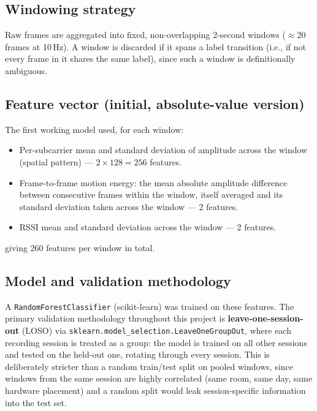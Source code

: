 \documentclass[11pt,a4paper]{article}
\begin{document}
\subsection{Windowing strategy}

Raw frames are aggregated into fixed, non-overlapping 2-second windows
(\(\approx\)20 frames at 10\,Hz). A window is discarded if it spans a
label transition (i.e., if not every frame in it shares the same
label), since such a window is definitionally ambiguous.

\subsection{Feature vector (initial, absolute-value version)}

The first working model used, for each window:
\begin{itemize}
    \item Per-subcarrier mean and standard deviation of amplitude across
    the window (spatial pattern) --- \(2 \times 128 = 256\) features.
    \item Frame-to-frame motion energy: the mean absolute
    amplitude difference between consecutive frames within the window,
    itself averaged and its standard deviation taken across the window
    --- 2 features.
    \item RSSI mean and standard deviation across the window --- 2
    features.
\end{itemize}
giving 260 features per window in total.

\subsection{Model and validation methodology}

A \texttt{RandomForestClassifier} (scikit-learn) was trained on these
features. The primary validation methodology throughout this project is
\textbf{leave-one-session-out} (LOSO) via
\texttt{sklearn.model\_selection.LeaveOneGroupOut}, where each
recording session is treated as a group: the model is trained on all
other sessions and tested on the held-out one, rotating through every
session. This is deliberately stricter than a random train/test split
on pooled windows, since windows from the same session are highly
correlated (same room, same day, same hardware placement) and a random
split would leak session-specific information into the test set.

\end{document}
